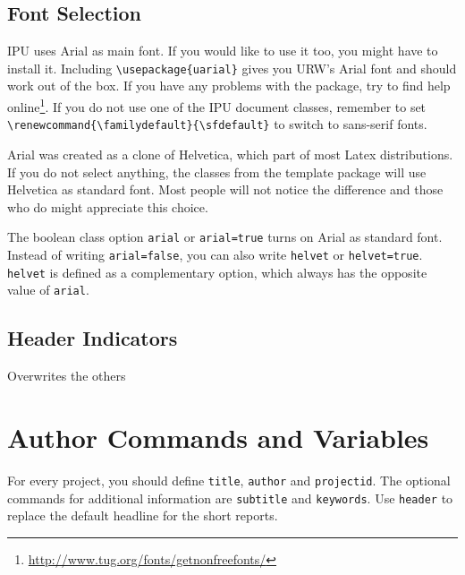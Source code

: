 \documentclass[short,comm,dots]{ipureport}
\begin{document}
\subsection{Font Selection}
IPU uses Arial as main font. If you would like to use it too, you might have to install it. Including \texttt{\textbackslash{}usepackage\{uarial\}} gives you URW's Arial font and should work out of the box. If you have any problems with the package, try to find help online\footnote{\url{http://www.tug.org/fonts/getnonfreefonts/}}. If you do not use one of the IPU document classes, remember to set \texttt{\textbackslash{}renewcommand\{\textbackslash{}familydefault\}\{\textbackslash{}sfdefault\}} to switch to sans-serif fonts. 

Arial was created as a clone of Helvetica, which part of most Latex distributions. If you do not select anything, the classes from the template package will use Helvetica as standard font. Most people will not notice the difference and those who do might appreciate this choice. 

The boolean class option \texttt{arial} or \texttt{arial=true} turns on Arial as standard font. Instead of writing \texttt{arial=false}, you can also write \texttt{helvet} or \texttt{helvet=true}. \texttt{helvet} is defined as a complementary option, which always has the opposite value of \texttt{arial}. 

\subsection{Header Indicators}
%
%
%
 Overwrites the others
%
\section{Author Commands and Variables}

For every project, you should define \texttt{title}, \texttt{author} and \texttt{projectid}. The optional 
commands for additional information are \texttt{subtitle} and \texttt{keywords}. Use \texttt{header} to replace the default 
headline for the short reports. 



\blinddocument
{}
\blindmathpaper

\end{document}
